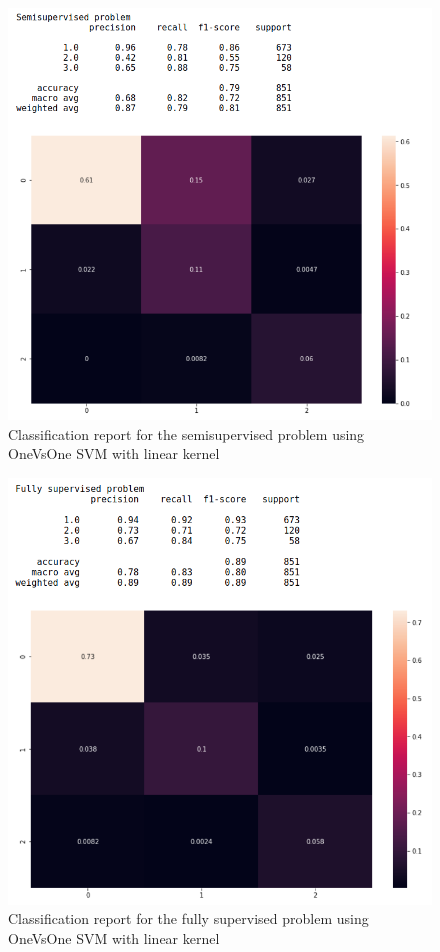 \documentclass[a4paper,12pt]{article}
\begin{document}
\begin{figure}[H]
  \begin{center}
  \includegraphics[width=1.0\textwidth]{images/semi.png}
  \end{center}
  \caption{Classification report for the semisupervised problem using OneVsOne SVM with linear kernel}
  \label{fig:semi}
\end{figure}

\begin{figure}[H]
  \begin{center}
  \includegraphics[width=1.0\textwidth]{images/fully.png}
  \end{center}
  \caption{Classification report for the fully supervised problem using OneVsOne SVM with linear kernel}
  \label{fig:fully}
\end{figure}
\end{document}
